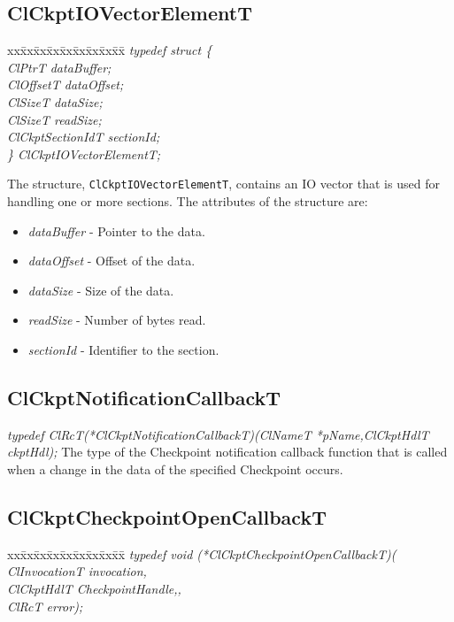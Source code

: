 \begin{flushleft}
\subsection{ClCkptIOVectorElementT}
\begin{tabbing}
xx\=xx\=xx\=xx\=xx\=xx\=xx\=xx\=xx\=\kill
\textit{typedef struct \{}\\
\>\>\>\>\textit{ClPtrT dataBuffer;}\\
\>\>\>\>\textit{ClOffsetT dataOffset;}\\
\>\>\>\>\textit{ClSizeT dataSize;}\\
\>\>\>\>\textit{ClSizeT readSize;}\\
\>\>\>\>\textit{ClCkptSectionIdT sectionId;}\\
\textit{\} ClCkptIOVectorElementT;}\end{tabbing}
The structure, {\tt{ClCkptIOVectorElementT}}, contains an IO vector that is used for handling one or more
sections. The attributes of the structure are:
\begin{itemize}
\item
\textit{dataBuffer} - Pointer to the data.
\item
\textit{dataOffset} - Offset of the data.
\item
\textit{dataSize} - Size of the data.
\item
\textit{readSize} - Number of bytes read.
\item
\textit{sectionId} - Identifier to the section.
\end{itemize}


\subsection{ClCkptNotificationCallbackT}
\textit{typedef ClRcT(*ClCkptNotificationCallbackT)(ClNameT *pName,ClCkptHdlT ckptHdl);}
\newline
\newline
The type of the Checkpoint notification callback function that is called when a change in the data of the specified Checkpoint occurs. 

\subsection{ClCkptCheckpointOpenCallbackT}
\begin{tabbing}
xx\=xx\=xx\=xx\=xx\=xx\=xx\=xx\=xx\=\kill
\textit{typedef void (*ClCkptCheckpointOpenCallbackT)(}\\
\>\>\>\>\textit{ClInvocationT     invocation,}\\
\>\>\>\>\textit{ClCkptHdlT          CheckpointHandle,,}\\
\>\>\>\>\textit{ClRcT                   error);}
\end{tabbing}


\end{flushleft}
